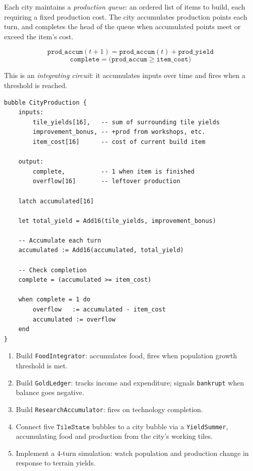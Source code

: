 \documentclass[11pt,a4paper,openany]{book}
\theoremstyle{plain}
\theoremstyle{definition}
\theoremstyle{remark}
\newenvironment{implementation}{%
  \begin{mdframed}[
    linecolor=sphereamber!80, backgroundcolor=sphereamber!5,
    linewidth=1pt, innertopmargin=8pt, innerbottommargin=8pt,
    innerleftmargin=10pt, innerrightmargin=10pt,
    skipabove=10pt, skipbelow=6pt
  ]%
  \setlength{\parindent}{0pt}%
  \noindent{\textcolor{sphereamber!80!black}{\textbf{Implementation}}}\par\smallskip\ignorespaces
}{\end{mdframed}}
\newenvironment{project}[1]{%
  \begin{tcolorbox}[
    title={\textbf{Project: #1}},
    colback=projectbg,
    colframe=sphereblue,
    fonttitle=\bfseries\color{white},
    coltitle=white,
    attach boxed title to top left={yshift=-2mm, xshift=4mm},
    boxed title style={colback=sphereblue, sharp corners},
    sharp corners,
    breakable,
    before upper={\normalfont\setlength{\parindent}{0pt}\tolerance=9999\hbadness=9999}
  ]
}{\end{tcolorbox}}
\begin{document}
Each city maintains a \emph{production queue}: an ordered list of items to
build, each requiring a fixed production cost. The city accumulates
production points each turn, and completes the head of the queue when
accumulated points meet or exceed the item's cost.

\[
  \texttt{prod\_accum}(t+1) = \texttt{prod\_accum}(t) + \texttt{prod\_yield}
\]
\[
  \texttt{complete} = \bigl(\texttt{prod\_accum} \geq \texttt{item\_cost}\bigr)
\]

This is an \emph{integrating circuit}: it accumulates inputs over time and
fires when a threshold is reached.

\begin{implementation}
\begin{lstlisting}[caption={City production bubble}]
bubble CityProduction {
    inputs:
        tile_yields[16],   -- sum of surrounding tile yields
        improvement_bonus, -- +prod from workshops, etc.
        item_cost[16]      -- cost of current build item

    output:
        complete,          -- 1 when item is finished
        overflow[16]       -- leftover production

    latch accumulated[16]

    let total_yield = Add16(tile_yields, improvement_bonus)

    -- Accumulate each turn
    accumulated := Add16(accumulated, total_yield)

    -- Check completion
    complete = (accumulated >= item_cost)

    when complete = 1 do
        overflow   := accumulated - item_cost
        accumulated := overflow
    end
}
\end{lstlisting}
\end{implementation}

\begin{project}{Resource Circuits}
  \begin{enumerate}
    \item Build \texttt{FoodIntegrator}: accumulates food, fires when
          population growth threshold is met.
    \item Build \texttt{GoldLedger}: tracks income and expenditure;
          signals \texttt{bankrupt} when balance goes negative.
    \item Build \texttt{ResearchAccumulator}: fires on technology completion.
    \item Connect five $\texttt{TileState}$ bubbles to a city bubble via
          a \texttt{YieldSummer}, accumulating food and production
          from the city's working tiles.
    \item Implement a 4-turn simulation: watch population and production
          change in response to terrain yields.
  \end{enumerate}
\end{project}
\end{document}
